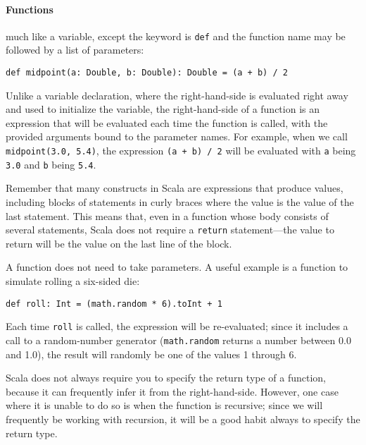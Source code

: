 \paragraph{Functions}

 much like a variable, except the keyword is \texttt{def} and the function name may be followed by a list of parameters:
\begin{verbatim}
def midpoint(a: Double, b: Double): Double = (a + b) / 2
\end{verbatim}
Unlike a variable declaration, where the right-hand-side is evaluated right away and used to initialize the variable, the right-hand-side of a function is an expression that will be evaluated each time the function is called, with the provided arguments bound to the parameter names. For example, when we call \texttt{midpoint(3.0, 5.4)}, the expression \texttt{(a + b) / 2} will be evaluated with \texttt{a} being \texttt{3.0} and \texttt{b} being \texttt{5.4}.

Remember that many constructs in Scala are expressions that produce values, including blocks of statements in curly braces where the value is the value of the last statement. This means that, even in a function whose body consists of several statements, Scala does not require a \texttt{return} statement---the value to return will be the value on the last line of the block.

A function does not need to take parameters. A useful example is a function to simulate rolling a six-sided die:
\begin{verbatim}
def roll: Int = (math.random * 6).toInt + 1
\end{verbatim}
Each time \texttt{roll} is called, the expression will be re-evaluated; since it includes a call to a random-number generator (\texttt{math.random} returns a number between 0.0 and 1.0), the result will randomly be one of the values 1 through 6.

Scala does not always require you to specify the return type of a function, because it can frequently infer it from the right-hand-side. However, one case where it is unable to do so is when the function is recursive; since we will frequently be working with recursion, it will be a good habit always to specify the return type.

